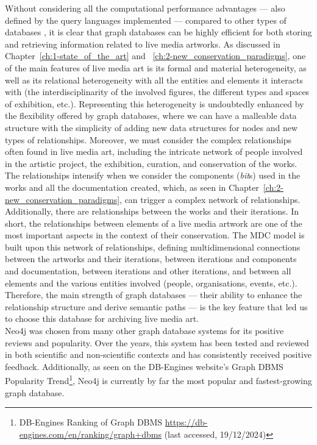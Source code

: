 Without considering all the computational performance advantages — also defined by the query languages implemented — compared to other types of databases \cite{vicknair2010comparison, guia2017graph, fernandes2018graph}, it is clear that graph databases can be highly efficient for both storing and retrieving information related to live media artworks. As discussed in Chapter~\ref{ch:1-state_of_the_art} and ~\ref{ch:2-new_conservation_paradigms}, one of the main features of live media art is its formal and material heterogeneity, as well as its relational heterogeneity with all the entities and elements it interacts with (the interdisciplinarity of the involved figures, the different types and spaces of exhibition, etc.). Representing this heterogeneity is undoubtedly enhanced by the flexibility offered by graph databases, where we can have a malleable data structure with the simplicity of adding new data structures for nodes and new types of relationships. Moreover, we must consider the complex relationships often found in live media art, including the intricate network of people involved in the artistic project, the exhibition, curation, and conservation of the works. The relationships intensify when we consider the components (\textit{bit}s) used in the works and all the documentation created, which, as seen in Chapter~\ref{ch:2-new_conservation_paradigms}, can trigger a complex network of relationships.\\
Additionally, there are relationships between the works and their iterations. In short, the relationships between elements of a live media artwork are one of the most important aspects in the context of their conservation. The MDC model is built upon this network of relationships, defining multidimensional connections between the artworks and their iterations, between iterations and components and documentation, between iterations and other iterations, and between all elements and the various entities involved (people, organisations, events, etc.). Therefore, the main strength of graph databases — their ability to enhance the relationship structure and derive semantic paths — is the key feature that led us to choose this database for archiving live media art.\\
Neo4j was chosen from many other graph database systems for its positive reviews and popularity. Over the years, this system has been tested and reviewed in both scientific and non-scientific contexts \cite{vicknair2010comparison, robinson2013graph, lourencco2015choosing, guia2017graph, fernandes2018graph, khan2023sql} and has consistently received positive feedback. Additionally, as seen on the DB-Engines website’s Graph DBMS Popularity Trend\footnote{DB-Engines Ranking of Graph DBMS \url{https://db-engines.com/en/ranking/graph+dbms} (last accessed, 19/12/2024)}, Neo4j is currently by far the most popular and fastest-growing graph database.\\
